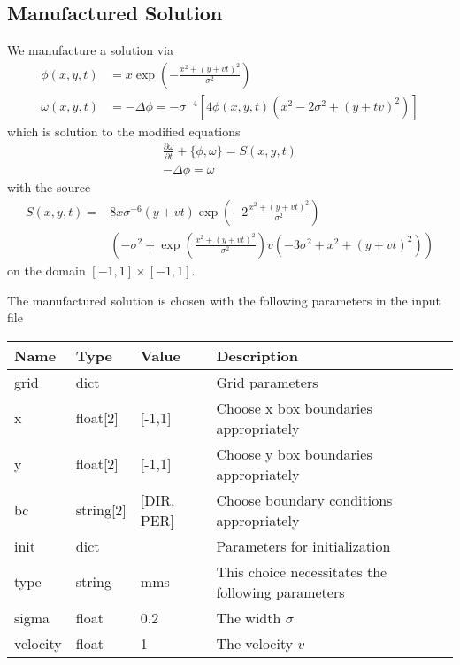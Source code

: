 \subsection{Manufactured Solution}
We manufacture a solution via
\begin{align}
    \phi(x,y,t) &=
    x \exp\left( - \frac{ x^2 + (y+vt)^2}{\sigma^2}\right) \\
    \omega(x,y,t) &= -\Delta \phi = -\sigma^{-4} \left[ 4\phi(x,y,t) ( x^2-2\sigma^2  + (y+tv)^2)\right]
\end{align}
which is solution to the modified equations
\begin{subequations}
\begin{align}
    \frac{\partial \omega}{\partial t} + \{ \phi, \omega\} = S(x,y,t) \\
    -\Delta \phi = \omega
\end{align}
\label{eq:euler_poisson_modified}
\end{subequations}
with the source
\begin{align}
    S(x,y,t) =& 8 x \sigma^{-6}(y+vt)\exp\left( - 2\frac{ x^2 + (y+vt)^2}{\sigma^2} \right) \nonumber\\
    &\left(-\sigma^2  + \exp\left( \frac{ x^2 + (y+vt)^2}{\sigma^2} \right) v( -3\sigma^2 + x^2 + (y+vt)^2) \right)
\end{align}
on the domain $[-1,1]\times [-1,1]$.

The manufactured solution is chosen with the following parameters in the input file
\begin{longtable}{llll}
\toprule
\rowcolor{gray!50}\textbf{Name} &  \textbf{Type} & \textbf{Value}  & \textbf{Description}  \\ \midrule
grid & dict &  & Grid parameters \\
\qquad x & float[2]& [-1,1] & Choose x box boundaries appropriately \\
\qquad y & float[2]& [-1,1] & Choose y box boundaries appropriately \\
\qquad bc & string[2] & [DIR, PER] & Choose boundary conditions appropriately \\
init &  dict &   & Parameters for initialization \\
\qquad type      & string & mms & This choice necessitates the following parameters \\
\qquad sigma      & float & 0.2 & The width $\sigma$ \\
\qquad velocity   & float & 1 & The velocity $v$ \\
\bottomrule
\end{longtable}

